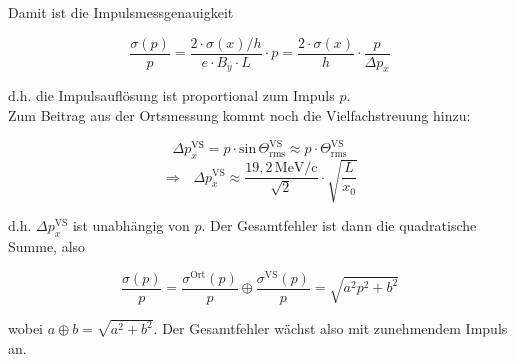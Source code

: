 Damit ist die Impulsmessgenauigkeit

\[ \frac{\sigma(p)}{p} = \frac{2\cdot\sigma(x)/h}{e\cdot B_y\cdot L}\cdot p =
\frac{2\cdot\sigma(x)}{h}\cdot \frac{p}{\Delta p_x} \]

d.h. die Impulsauflösung ist proportional zum Impuls $p$.
\\
Zum Beitrag aus der Ortsmessung kommt noch die Vielfachstreuung hinzu:

\[\Delta p_x^{\text{VS}} = p\cdot \text{sin}\,\Theta^{\text{VS}}_{\text{rms}} \approx p \cdot
\Theta^{\text{VS}}_{\text{rms}} \]
\[ \Rightarrow~~~ \Delta p_x^{\text{VS}} \approx \frac{19{,}2\,\text{MeV/c}}{\sqrt{2}}\cdot
\sqrt{\frac{L}{x_0}} \]

d.h. $\Delta p_x^{\text{VS}}$ ist unabhängig von $p$. Der Gesamtfehler ist dann die quadratische
Summe, also

\[ \frac{\sigma(p)}{p} = \frac{\sigma^{\text{Ort}}(p)}{p} \oplus
\frac{\sigma^{\text{VS}}(p)}{p} = \sqrt{a^2p^2+b^2}\]

wobei $a\oplus b = \sqrt{a^2+b^2}$. Der Gesamtfehler wächst also mit zunehmendem Impuls an.

\begin{figure}[H]
		\centering
		
\end{figure} 